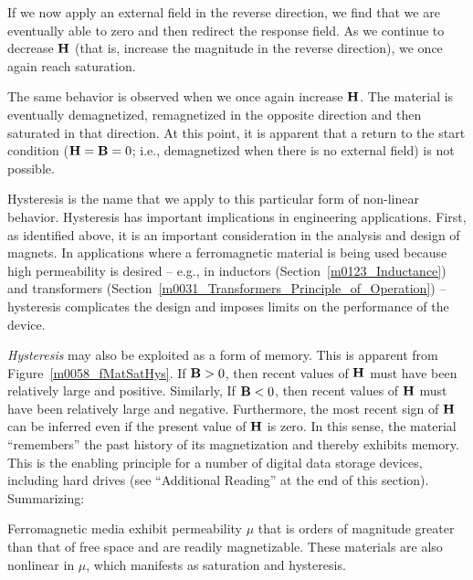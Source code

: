 If we now apply an external field in the reverse direction, we find that we are eventually able to zero and then redirect the response field.
As we continue to decrease ${\bf H}$ (that is, increase the magnitude in the reverse direction), we once again reach saturation.

The same behavior is observed when we once again increase ${\bf H}$.  The material is eventually demagnetized, remagnetized in the opposite direction and then saturated in that direction.
At this point, it is apparent that a return to the start condition (${\bf H}={\bf B}=0$; i.e., demagnetized when there is no external field) is not possible.

Hysteresis is the name that we apply to this particular form of non-linear behavior.
Hysteresis has important implications in engineering applications.
First, as identified above, it is an important consideration in the analysis and design of magnets.
In applications where a ferromagnetic material is being used because high permeability is desired -- e.g., in inductors 
(Section~\ref{m0123_Inductance}) and transformers (Section~\ref{m0031_Transformers_Principle_of_Operation}) 
-- hysteresis complicates the design and imposes limits on the performance of the device.

\emph{Hysteresis} 
may also be exploited as a form of memory.
This is apparent from Figure~\ref{m0058_fMatSatHys}.
If ${\bf B}>0$, then recent values of ${\bf H}$ must have been relatively large and positive.  Similarly,
If ${\bf B}<0$, then recent values of ${\bf H}$ must have been relatively large and negative.
Furthermore, the most recent sign of ${\bf H}$ can be inferred even if the present value of ${\bf H}$ is zero.
In this sense, the material ``remembers'' the past history of its magnetization and thereby exhibits memory.
This is the enabling principle for a number of digital data storage devices, including hard drives (see ``Additional Reading'' at the end of this section).
Summarizing:
%
\begin{mdframed}[backgroundcolor=yellow!20,nobreak=true] 
Ferromagnetic media exhibit permeability $\mu$ that is orders of magnitude greater than that of free space and are readily magnetizable.  
These materials are also nonlinear in $\mu$, which manifests as saturation and hysteresis.
\end{mdframed}


